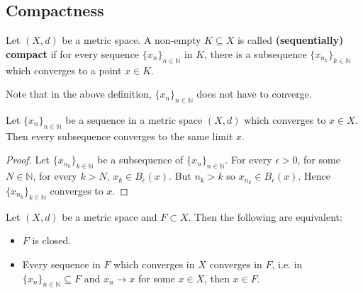 \subsection{Compactness}

\begin{definition}\label{def:compactSet}
	Let $(X, d)$ be a metric space. A non-empty $K \subseteq X$ is called \textbf{(sequentially) compact} if for every sequence $\{ x_n \}_{n \in \mathbb{N}}$ in $K$, there is a subsequence $\{ x_{n_k} \}_{k \in \mathbb{N}}$ which converges to a point $x \in K$.
\end{definition}

\begin{remark}
	Note that in the above definition, $\{ x_n \}_{n \in \mathbb{N}}$ does not have to converge.
\end{remark}

\begin{lemma}\label{lem:subsequenceConvergesToSameLimit}
	Let $\{ x_n \}_{n \in \mathbb{N}}$ be a sequence in a metric space $(X, d)$ which converges to $x \in X$. Then every subsequence converges to the same limit $x$.
\end{lemma}

\begin{proof}
	Let $\{ x_{n_k} \}_{k \in \mathbb{N}}$ be a subsequence of $\{ x_n \}_{n \in \mathbb{N}}$. For every $\epsilon > 0$, for some $N \in \mathbb{N}$, for every $k > N$, $x_k \in B_{\epsilon}(x)$. But $n_k > k$ so $x_{n_k} \in B_{\epsilon}(x)$. Hence $\{ x_{n_k} \}_{k \in \mathbb{N}}$ converges to $x$.
\end{proof}

\begin{proposition}\label{prop:convergenceInClosedSubset}
	Let $(X, d)$ be a metric space and $F \subset X$. Then the following are equivalent:
	\begin{itemize}
		\item $F$ is closed.
		\item Every sequence in $F$ which converges in $X$ converges in $F$, i.e. in $\{ x_n \}_{n \in \mathbb{N}} \subseteq F$ and $x_n \rightarrow x$ for some $x \in X$, then $x \in F$.
	\end{itemize}
\end{proposition}


